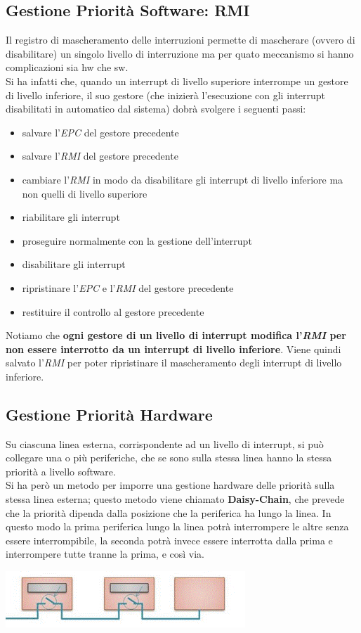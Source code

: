 \documentclass[a4paper,12pt, oneside]{book}
\begin{document}
\subsection{Gestione Priorità Software: RMI}
Il registro di mascheramento delle interruzioni permette di mascherare
(ovvero di disabilitare) un singolo livello di interruzione ma per
quato meccanismo si hanno complicazioni sia hw che sw.\\
Si ha infatti che, quando un interrupt di livello superiore interrompe
un gestore di livello inferiore, il suo gestore (che inizierà
l'esecuzione con gli interrupt disabilitati in automatico dal sistema)
dobrà svolgere i seguenti passi:
\begin{itemize}
  \item salvare l'\textit{EPC} del gestore precedente
  \item salvare l'\textit{RMI} del gestore precedente
  \item cambiare l'\textit{RMI} in modo da disabilitare gli interrupt
  di livello inferiore ma non quelli di livello superiore
  \item riabilitare gli interrupt
  \item proseguire normalmente con la gestione dell'interrupt
  \item disabilitare gli interrupt
  \item ripristinare l'\textit{EPC} e l'\textit{RMI} del gestore
  precedente
  \item restituire il controllo al gestore precedente
\end{itemize}
Notiamo che \textbf{ogni gestore di un livello di interrupt modifica
  l'\textit{RMI} per non essere interrotto da un interrupt di livello
inferiore}. Viene quindi salvato l'\textit{RMI} per poter ripristinare
il mascheramento degli interrupt di livello inferiore.
\subsection{Gestione Priorità Hardware}
Su ciascuna linea esterna, corrispondente ad un livello di interrupt,
si può collegare una o più periferiche, che se sono sulla stessa linea
hanno la stessa priorità a livello software.\\
Si ha però un metodo per imporre una gestione hardware delle priorità
sulla stessa linea esterna; questo metodo viene chiamato
\textbf{Daisy-Chain}, che prevede che la priorità dipenda dalla
posizione che la periferica ha lungo la linea. In questo modo la prima
periferica lungo la linea potrà interrompere le altre senza essere
interrompibile, la seconda potrà invece essere interrotta dalla prima
e interrompere tutte tranne la prima, e così via.
\begin{center}
  \includegraphics[scale = 0.7]{img/prio.png}
\end{center}
\end{document}
